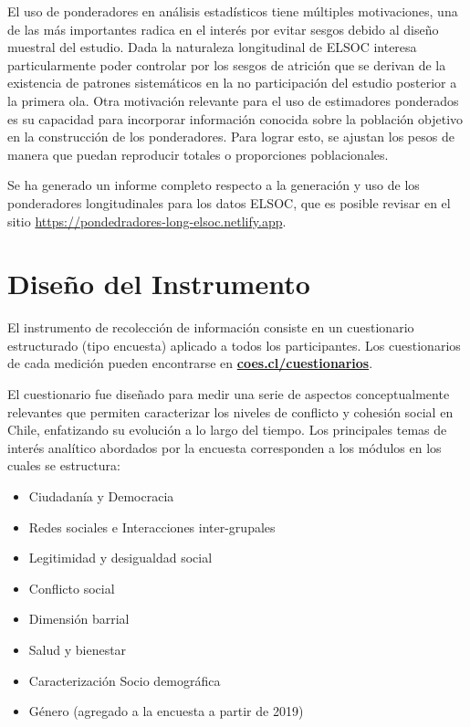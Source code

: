 \documentclass[
  12pt,
]{article}
\providecommand{\tightlist}{%
  \setlength{\itemsep}{0pt}\setlength{\parskip}{0pt}}
\begin{document}
El uso de ponderadores en análisis estadísticos tiene múltiples motivaciones, una de las más importantes radica en el interés por evitar sesgos debido al diseño muestral del estudio. Dada la naturaleza longitudinal de ELSOC interesa particularmente poder controlar por los sesgos de atrición que se derivan de la existencia de patrones sistemáticos en la no participación del estudio posterior a la primera ola. Otra motivación relevante para el uso de estimadores ponderados es su capacidad para incorporar información conocida sobre la población objetivo en la construcción de los ponderadores. Para lograr esto, se ajustan los pesos de manera que puedan reproducir totales o proporciones poblacionales.

Se ha generado un informe completo respecto a la generación y uso de los ponderadores longitudinales para los datos ELSOC, que es posible revisar en el sitio \url{https://pondedradores-long-elsoc.netlify.app}.

\newpage

\hypertarget{dis_ins}{%
\section{Diseño del Instrumento}\label{dis_ins}}

El instrumento de recolección de información consiste en un cuestionario estructurado (tipo encuesta) aplicado a todos los participantes. Los cuestionarios de cada medición pueden encontrarse en \href{https://coes.cl/cuestionarios/}{\textbf{coes.cl/cuestionarios}}.

El cuestionario fue diseñado para medir una serie de aspectos conceptualmente relevantes que permiten caracterizar los niveles de conflicto y cohesión social en Chile, enfatizando su evolución a lo largo del tiempo. Los principales temas de interés analítico abordados por la encuesta corresponden a los módulos en los cuales se estructura:

\begin{itemize}
\tightlist
\item
  Ciudadanía y Democracia
\item
  Redes sociales e Interacciones inter-grupales
\item
  Legitimidad y desigualdad social
\item
  Conflicto social
\item
  Dimensión barrial
\item
  Salud y bienestar
\item
  Caracterización Socio demográfica
\item
  Género (agregado a la encuesta a partir de 2019)
\end{itemize}
\end{document}
